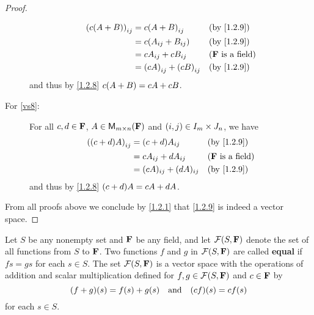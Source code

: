 \begin{proof}
\begin{description}
\begin{align*}
        \p{c \p{A + B}}_{i j} & = c \p{A + B}_{i j}           &  & \text{(by \cref{1.2.9})}   \\
                              & = c \p{A_{i j} + B_{i j}}     &  & \text{(by \cref{1.2.9})}   \\
                              & = c A_{i j} + c B_{i j}       &  & \text{(\(\F\) is a field)} \\
                              & = \p{cA}_{i j} + \p{cB}_{i j} &  & \text{(by \cref{1.2.9})}
      \end{align*}
      and thus by \cref{1.2.8} \(c \p{A + B} = cA + cB\).
    \item[For \ref{vs8}:]
      For all \(c, d \in \mathbf{F}\), \(A \in {{\mathsf{M}_{{m} \times n}({\mathbf{F}})}}\) and \(\left\lparen i, j\right\rparen \in I_{m} \times J_{n}\), we have
      \begin{align*}
        \p{\p{c + d} A}_{i j} & = \p{c + d} A_{i j}       &  & \text{(by \cref{1.2.9})}   \\
                              & = c A_{i j} + d A_{i j}   &  & \text{(\(\F\) is a field)} \\
                              & = (cA)_{i j} + (dA)_{i j} &  & \text{(by \cref{1.2.9})}
      \end{align*}
      and thus by \cref{1.2.8} \(\p{c + d} A = cA + dA\).
  \end{description}
  From all proofs above we conclude by \cref{1.2.1} that \cref{1.2.9} is indeed a vector space.
\end{proof}

\begin{eg}\label{1.2.10}
  Let \(S\) be any nonempty set and \(\mathbf{F}\) be any field, and let \(\FS\) denote the set of all functions from \(S\) to \(\mathbf{F}\).
  Two functions \(f\) and \(g\) in \(\FS\) are called \textbf{equal} if \(f{s} = g{s}\) for each \(s \in S\).
  The set \(\FS\) is a vector space with the operations of addition and scalar multiplication defined for \(f, g \in \FS\) and \(c \in \mathbf{F}\) by
  \[
    \p{f + g}\p{s} = f\p{s} + g\p{s} \quad \text{and} \quad \p{cf}\p{s} = cf\p{s}
  \]
  for each \(s \in S\).
\end{eg}

